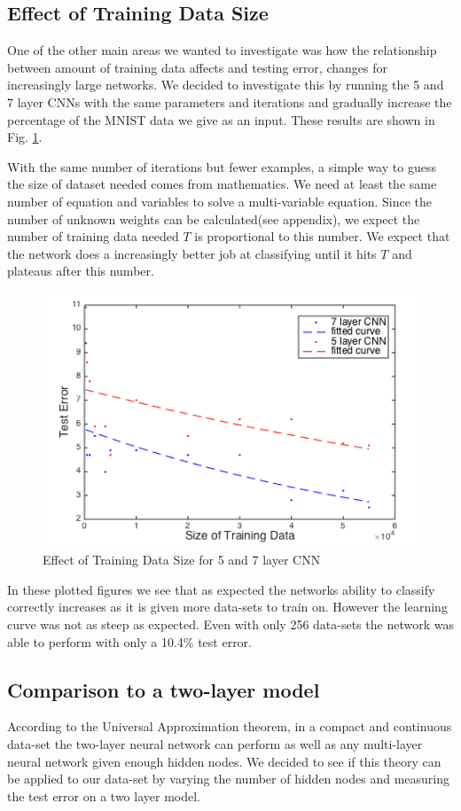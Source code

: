 \documentclass[12pt, twocolumn]{article}
\begin{document}
\subsection{Effect of Training Data Size}
One of the other main areas we wanted to investigate was how the relationship between amount of training data affects and testing error, changes for increasingly large networks. We decided to investigate this by running the 5 and 7 layer CNNs with the same parameters and iterations and gradually increase the percentage of the MNIST data we give as an input. These results are shown in Fig. \ref{fig:trainsize}.  

With the same number of iterations but fewer examples, a simple way to guess the size of dataset needed comes from mathematics.  We need at least the same number of equation and variables to solve a multi-variable equation. Since the number of unknown weights can be calculated(see appendix), we expect the number of training data needed $T$ is proportional to this number. We expect that the network does a increasingly better job at classifying until it hits $T$ and plateaus after this number.

\begin{figure}
\includegraphics[scale=.5]{trainingsize.png}
\caption{Effect of Training Data Size for 5 and 7 layer CNN}
\label{fig:trainsize}
\end{figure}


In these plotted figures we see that as expected the networks ability to classify correctly increases as it is given more data-sets to train on. However the learning curve was not as steep as expected. Even with only 256 data-sets the network was able to perform with only a 10.4\% test error.

\subsection{Comparison to a two-layer model}
According to the Universal Approximation theorem, in a compact and continuous data-set the two-layer neural network can perform as well as any multi-layer neural network given enough hidden nodes. We decided to see if this theory can be applied to our data-set by varying the number of hidden nodes and measuring the test error on a two layer model.
 
\end{document}

